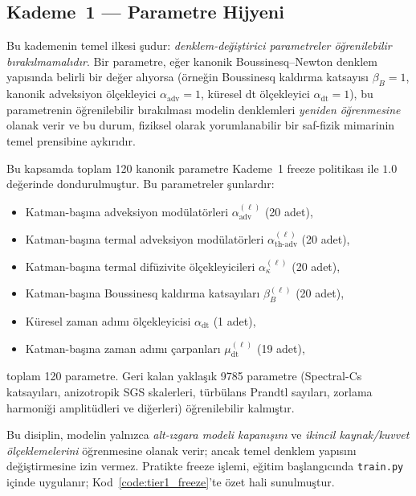 \subsection{Kademe~1 — Parametre Hijyeni}
\label{subsec:tier1_param_hygiene}

Bu kademenin temel ilkesi şudur: \emph{denklem-değiştirici parametreler öğrenilebilir bırakılmamalıdır}. Bir parametre, eğer kanonik Boussinesq--Newton denklem yapısında belirli bir değer alıyorsa (örneğin Boussinesq kaldırma katsayısı $\beta_{B}=1$, kanonik adveksiyon ölçekleyici $\alpha_{\mathrm{adv}}=1$, küresel dt ölçekleyici $\alpha_{\mathrm{dt}}=1$), bu parametrenin öğrenilebilir bırakılması modelin denklemleri \emph{yeniden öğrenmesine} olanak verir ve bu durum, fiziksel olarak yorumlanabilir bir saf-fizik mimarinin temel prensibine aykırıdır.

Bu kapsamda toplam 120 kanonik parametre Kademe~1 freeze politikası ile $1.0$ değerinde dondurulmuştur. Bu parametreler şunlardır:
\begin{itemize}
  \item Katman-başına adveksiyon modülatörleri $\alpha_{\mathrm{adv}}^{(\ell)}$ (20 adet),
  \item Katman-başına termal adveksiyon modülatörleri $\alpha_{\mathrm{th\text{-}adv}}^{(\ell)}$ (20 adet),
  \item Katman-başına termal difüzivite ölçekleyicileri $\alpha_{\kappa}^{(\ell)}$ (20 adet),
  \item Katman-başına Boussinesq kaldırma katsayıları $\beta_{B}^{(\ell)}$ (20 adet),
  \item Küresel zaman adımı ölçekleyicisi $\alpha_{\mathrm{dt}}$ (1 adet),
  \item Katman-başına zaman adımı çarpanları $\mu_{\mathrm{dt}}^{(\ell)}$ (19 adet),
\end{itemize}
toplam 120 parametre. Geri kalan yaklaşık 9785 parametre (Spectral-Cs katsayıları, anizotropik SGS skalerleri, türbülans Prandtl sayıları, zorlama harmoniği amplitüdleri ve diğerleri) öğrenilebilir kalmıştır.

Bu disiplin, modelin yalnızca \emph{alt-ızgara modeli kapanışını} ve \emph{ikincil kaynak/kuvvet ölçeklemelerini} öğrenmesine olanak verir; ancak temel denklem yapısını değiştirmesine izin vermez. Pratikte freeze işlemi, eğitim başlangıcında \texttt{train.py} içinde uygulanır; Kod~\ref{code:tier1_freeze}'te özet hali sunulmuştur.

